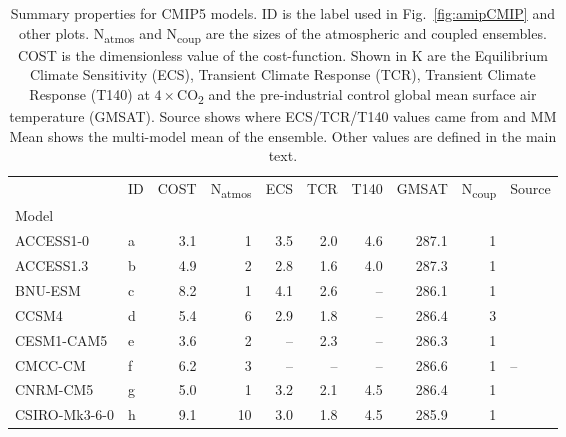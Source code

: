 \begin{table}
\centering
\caption{\small{Summary properties for CMIP5 models. 
 ID is the label used in Fig.~\ref{fig:amipCMIP} and other plots. N\textsubscript{atmos} and N\textsubscript{coup} are the sizes of the atmospheric and coupled ensembles.  
 COST is the dimensionless value of the cost-function.
  Shown in K are the Equilibrium Climate Sensitivity (ECS), Transient Climate Response (TCR), Transient Climate Response (T140) at $4\times$CO\textsubscript{2} and the 
  pre-industrial control global mean surface air temperature (GMSAT). 
   Source shows where ECS/TCR/T140 values came from and MM Mean shows the multi-model mean of the ensemble. Other values are defined in the main text.}}
\label{tab:cmip5}
\begin{tabular}{llrrrrrrrl}
\toprule
{} &  ID &  COST &  N\textsubscript{atmos} &  ECS &  TCR &  T140 &  GMSAT &  N\textsubscript{coup} &                   Source \\
Model         &     &       &                         &      &      &       &        &                        &                          \\
\midrule
ACCESS1-0     &   a &   3.1 &                       1 &  3.5 &  2.0 &   4.6 &  287.1 &                      1 &     \citet{gregory15tcr} \\
ACCESS1.3     &   b &   4.9 &                       2 &  2.8 &  1.6 &   4.0 &  287.3 &                      1 &     \citet{gregory15tcr} \\
BNU-ESM       &   c &   8.2 &                       1 &  4.1 &  2.6 &    -- &  286.1 &                      1 &  \citet{stocker2013ipcc} \\
CCSM4         &   d &   5.4 &                       6 &  2.9 &  1.8 &    -- &  286.4 &                      3 &  \citet{stocker2013ipcc} \\
CESM1-CAM5    &   e &   3.6 &                       2 &   -- &  2.3 &    -- &  286.3 &                      1 &  \citet{stocker2013ipcc} \\
CMCC-CM       &   f &   6.2 &                       3 &   -- &   -- &    -- &  286.6 &                      1 &                       -- \\
CNRM-CM5      &   g &   5.0 &                       1 &  3.2 &  2.1 &   4.5 &  286.4 &                      1 &     \citet{gregory15tcr} \\
CSIRO-Mk3-6-0 &   h &   9.1 &                      10 &  3.0 &  1.8 &   4.5 &  285.9 &                      1 &     \citet{gregory15tcr} \\

\end{tabular}
\end{table}

